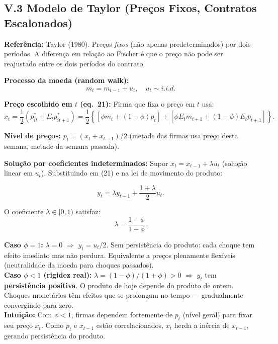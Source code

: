 \documentclass[12pt, a4paper]{article}
\begin{document}
\subsection*{V.3 Modelo de Taylor (Preços Fixos, Contratos Escalonados)}

\textbf{Referência:} Taylor (1980). Preços \emph{fixos} (não apenas predeterminados) por dois períodos. A diferença em relação ao Fischer é que o preço não pode ser reajustado entre os dois períodos do contrato.

\textbf{Processo da moeda (random walk):}
\[
m_t = m_{t-1} + u_t, \quad u_t \sim i.i.d.
\]

\textbf{Preço escolhido em $t$ (eq.\ 21):} Firma que fixa o preço em $t$ usa:
\begin{equation}
x_t = \frac{1}{2}(p_{it}^* + E_t p_{it+1}^*) = \frac{1}{2}\left\{[\phi m_t + (1-\phi)p_t] + [\phi E_t m_{t+1} + (1-\phi)E_t p_{t+1}]\right\}. \tag{eq.\ 21}
\end{equation}

\textbf{Nível de preços:} $p_t = (x_t + x_{t-1})/2$ (metade das firmas usa preço desta semana, metade da semana passada).

\textbf{Solução por coeficientes indeterminados:} Supor $x_t = x_{t-1} + \lambda u_t$ (solução linear em $u_t$). Substituindo em (21) e na lei de movimento do produto:

\begin{equation}
\boxed{y_t = \lambda y_{t-1} + \frac{1+\lambda}{2}u_t.} \tag{eq.\ 22}
\end{equation}

O coeficiente $\lambda \in [0,1)$ satisfaz:
\[
\lambda = \frac{1-\phi}{1+\phi}.
\]

\begin{resultbox}[title={Modelo de Taylor --- Resultados (eq.\ 22)}]
\textbf{Caso $\phi=1$:} $\lambda = 0$ $\Rightarrow$ $y_t = u_t/2$. Sem persistência do produto: cada choque tem efeito imediato mas não perdura. Equivalente a preços plenamente flexíveis (neutralidade da moeda para choques passados).\\[0.3em]
\textbf{Caso $\phi<1$ (rigidez real):} $\lambda = (1-\phi)/(1+\phi) > 0$ $\Rightarrow$ $y_t$ tem \textbf{persistência positiva}. O produto de hoje depende do produto de ontem. Choques monetários têm efeitos que se prolongam no tempo --- gradualmente convergindo para zero.\\[0.3em]
\textbf{Intuição:} Com $\phi<1$, firmas dependem fortemente de $p_t$ (nível geral) para fixar seu preço $x_t$. Como $p_t$ e $x_{t-1}$ estão correlacionados, $x_t$ herda a inércia de $x_{t-1}$, gerando persistência do produto.
\end{resultbox}
\end{document}
